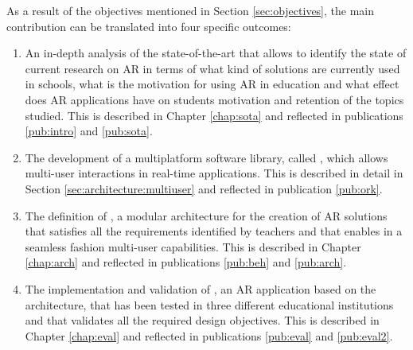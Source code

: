 As a result of the objectives mentioned in Section \ref{sec:objectives}, the main contribution can be translated into four specific outcomes:
\begin{enumerate}[start=1,,ref=C.\arabic*,label={\bfseries C\arabic*:}]
    \item An in-depth analysis of the state-of-the-art that allows to identify the state of current research on AR in terms of what kind of solutions are currently used in schools, what is the motivation for using AR in education and what effect does AR applications have on students motivation and retention of the topics studied. This is described in Chapter \ref{chap:sota} and reflected in publications \ref{pub:intro} and \ref{pub:sota}. \label{con:sota}
    \item The development of a multiplatform software library, called \textit{\ork{}}, which allows multi-user interactions in real-time applications. This is described in detail in Section \ref{sec:architecture:multiuser} and reflected in publication \ref{pub:ork}. \label{con:ork}
    \item The definition of \arch, a modular architecture for the creation of AR solutions that satisfies all the requirements identified by teachers and that enables in a seamless fashion multi-user capabilities. This is described in Chapter \ref{chap:arch} and reflected in publications \ref{pub:beh} and \ref{pub:arch}. \label{con:arch}
    \item The implementation and validation of \appname{}, an AR application based on the architecture, that has been tested in three different educational institutions and that validates all the required design objectives. This is described in Chapter \ref{chap:eval} and reflected in publications \ref{pub:eval} and \ref{pub:eval2}. \label{con:eval}
\end{enumerate}


